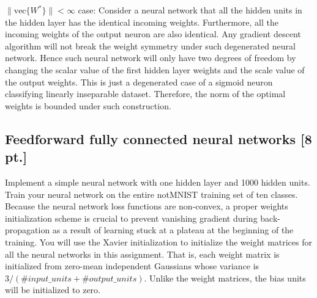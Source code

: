 \documentclass[12pt,letterpaper]{article}
\begin{document}
\begin{enumerate}
{$\|\text{vec}\{W^*\}\| < \infty$ case:
Consider a neural network that all the hidden units in the hidden layer has the identical incoming weights. Furthermore, all the incoming weights of the output neuron are also identical. Any gradient descent algorithm will not break the weight symmetry under such degenerated neural network. Hence such neural network will only have two degrees of freedom by changing the scalar value of the first hidden layer weights and the scale value of the output weights. This is just a degenerated case of a sigmoid neuron classifying linearly inseparable dataset. Therefore, the norm of the optimal weights is bounded under such construction.
}

\end{enumerate}

\subsection{Feedforward fully connected neural networks [8 pt.]}
\label{subsec:fcnn}
Implement a simple neural network with one hidden layer and 1000 hidden units. Train your neural network on the entire notMNIST training set of ten classes. Because the neural network loss functions are non-convex, a proper weights initialization scheme is crucial to prevent vanishing gradient during back-propagation as a result of learning stuck at a plateau at the beginning of the training. You will use the Xavier initialization to initialize the weight matrices for all the neural networks in this assignment. That is, each weight matrix is initialized from zero-mean independent Gaussians whose variance is $3 / (\#input\_units + \#output\_units )$. Unlike the weight matrices, the bias units will be initialized to zero.
\end{document}
